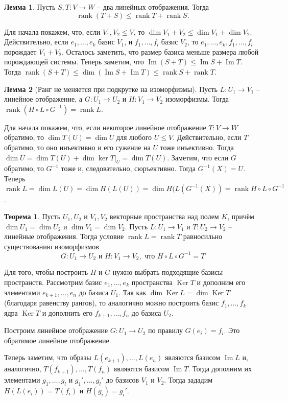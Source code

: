 \documentclass[10pt,a4paper,oneside]{book} %
\theoremstyle{definition}
\newtheorem{thm}{Теорема}
\newtheorem{lem}{Лемма}
\newcommand{\rank}{\operatorname{rank}}
\DeclareMathOperator{\Ker}{Ker}
\newcommand{\im}{\operatorname{Im}}
\def\thrm{\begin{thm}}
\def\ethrm{\end{thm}}
\def\lm{\begin{lem}}
\def\elm{\end{lem}}
\begin{document}
\lm Пусть $S, T \colon V \to W$ -- два линейных отображения. Тогда $$\rank (T + S) \leq \rank T + \rank S.$$
\elm
\proof Для начала покажем, что, если $V_1,V_2 \leq V$, то $\dim V_1 +V_2 \leq \dim V_1 + \dim V_2$. Действительно, если $e_1,\dots, e_k$ базис  $V_1$, и $f_1,\dots, f_l$ базис $V_2$, то $e_1,\dots, e_k, f_1, \dots, f_l$ порождает $V_1+V_2$. Осталось заметить, что размер базиса меньше размера любой порождающей системы.
Теперь заметим, что $\im (S+T) \leq \im S + \im T$. Тогда $\rank (S+T) \leq \dim (\im S + \im T) \leq \rank S + \rank T$. 
\endproof

\lm[Ранг не меняется при подкрутке на изоморфизмы] Пусть $L \colon U_1 \to V_1$ -- линейное отображение, а $G \colon U_1 \to U_2 $ и $H \colon V_1 \to V_2$ изоморфизмы. Тогда $\rank (H \circ L \circ G^{-1}) = \rank L$.
\elm
\proof Для начала покажем, что, если некоторое линейное отображение $T\colon V \to W$ обратимо, то  $\dim T(U)= \dim U$ для любого $U \leq V$. Действительно, если $T$ обратимо, то оно инъективно и его сужение на $U$ тоже инъективно. Тогда $\dim U = \dim T(U) + \dim \ker T|_U= \dim T(U)$.
Заметим, что если $G$ обратимо, то  $G^{-1}$ тоже и, следовательно, сюръективно. Тогда $G^{-1}(X)=U$.  Теперь $\rank L= \dim L(U)= \dim H(L(U))= \dim H(L(G^{-1}(X))= \rank H \circ L \circ G^{-1}$.
\endproof

\thrm Пусть $U_1, U_2$ и $V_1,V_2$ векторные пространства над полем $K$, причём  $\dim U_1=\dim U_2$ и $\dim V_1 =\dim V_2$. Пусть $L \colon U_1\to V_1$ и $T \colon U_2 \to V_2$ -- линейные отображения. Тогда условие $\rank L=\rank T$ равносильно существованию изоморфизмов 
$$G \colon U_1 \to U_2 \text{ и }  H \colon V_1 \to V_2, \text{ что }  H \circ L \circ G^{-1}=T$$
\ethrm
\proof Для того, чтобы построить $H$ и $G$ нужно выбрать подходящие базисы пространств. Рассмотрим базис $e_1,\dots, e_k$ пространства $\Ker T$ и дополним его элементами $e_{k+1},\dots, e_n$ до базиса $U_1$. Так как $\dim \Ker L = \dim \Ker T$ (благодаря равенству рангов), то аналогично можно построить базис $f_1,\dots, f_k$ ядра $\Ker T$ и дополнить его $f_{k+1},\dots, f_n$ до базиса $U_2$. 

Построим линейное отображение $G\colon U_1 \to U_2$ по правилу $G(e_i)=f_i$. Это обратимое линейное отображение.

Теперь заметим, что образы $L(e_{k+1}), \dots, L(e_n)$ являются базисом $\im L$ и, аналогично, $T(f_{k+1}), \dots, T(f_n)$  являются базисом $\im T$. Тогда дополним их элементами $g_1,\dots,g_l$ и $ g_1',\dots, g_l'$ до базисов $V_1$ и $V_2$. Тогда  зададим $H(L(e_i))=T(f_i)$ и $H(g_i)=g_i'$. 
\end{document}
